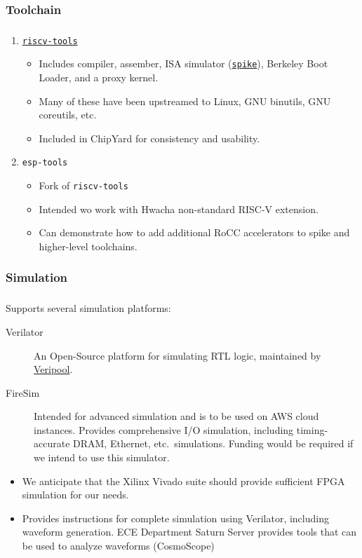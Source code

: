 \documentclass{weeklyslides}
\begin{document}
\subsubsection{Toolchain}\label{subsubsec:Toolchain} %
\begin{frame}
  \frametitle{}
  \begin{enumerate}
  \item \href{https://github.com/riscv/riscv-tools}{\texttt{riscv-tools}}
    \begin{itemize}
    \item Includes compiler, assember, ISA simulator (\href{https://github.com/riscv/riscv-isa-sim}{\texttt{spike}}), Berkeley Boot Loader, and a proxy kernel.
    \item Many of these have been upstreamed to Linux, GNU binutils, GNU coreutils, etc.
    \item Included in ChipYard for consistency and usability.
    \end{itemize}
  \item \texttt{esp-tools}
    \begin{itemize}
    \item Fork of \texttt{riscv-tools}
    \item Intended wo work with Hwacha non-standard RISC-V extension.
    \item Can demonstrate how to add additional RoCC accelerators to spike and higher-level toolchains.
    \end{itemize}
  \end{enumerate}
\end{frame}

\subsubsection{Simulation}\label{subsubsec:Simulation}
\begin{frame}
  \frametitle{}
  Supports several simulation platforms:
  \begin{description}
  \item[Verilator] An Open-Source platform for simulating RTL logic, maintained by \href{https://www.veripool.org/}{Veripool}.
  \item[FireSim] Intended for advanced simulation and is to be used on AWS cloud instances.
    Provides comprehensive I/O simulation, including timing-accurate DRAM, Ethernet, etc.\ simulations.
    Funding would be required if we intend to use this simulator.
  \end{description}
  \begin{itemize}
  \item We anticipate that the Xilinx Vivado suite should provide sufficient FPGA simulation for our needs.
  \item Provides instructions for complete simulation using Verilator, including waveform generation. ECE Department Saturn Server provides tools that can be used to analyze waveforms (CosmoScope)
  \end{itemize}
\end{frame}
\end{document}
